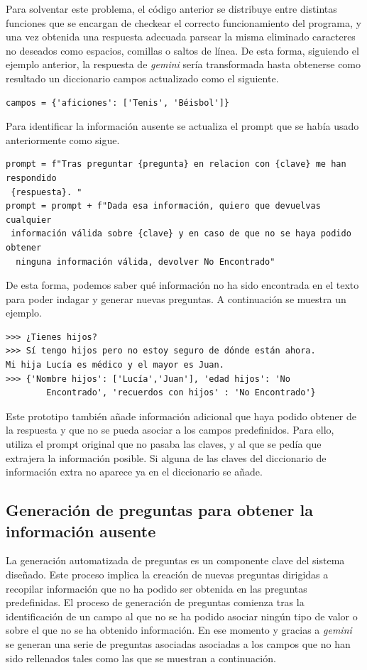 Para solventar este problema, el código anterior se distribuye entre distintas funciones que se encargan de checkear el correcto funcionamiento del programa, y una vez obtenida una respuesta adecuada parsear la misma eliminado caracteres no deseados como espacios, comillas o saltos de línea. De esta forma, siguiendo el ejemplo anterior, la respuesta de \textit{gemini} sería transformada hasta obtenerse como resultado un diccionario campos actualizado como el siguiente.  
\begin{verbatim}
campos = {'aficiones': ['Tenis', 'Béisbol']}
\end{verbatim}

Para identificar la información ausente se actualiza el prompt que se había usado anteriormente como sigue.  

\begin{verbatim}
prompt = f"Tras preguntar {pregunta} en relacion con {clave} me han respondido
 {respuesta}. "
prompt = prompt + f"Dada esa información, quiero que devuelvas cualquier
 información válida sobre {clave} y en caso de que no se haya podido obtener
  ninguna información válida, devolver No Encontrado"
\end{verbatim}
De esta forma, podemos saber qué información no ha sido encontrada en el texto para poder indagar y generar nuevas preguntas. A continuación se muestra un ejemplo.
\begin{verbatim}
>>>	¿Tienes hijos?
>>> Sí tengo hijos pero no estoy seguro de dónde están ahora.
Mi hija Lucía es médico y el mayor es Juan.
>>> {'Nombre hijos': ['Lucía','Juan'], 'edad hijos': 'No
		Encontrado', 'recuerdos con hijos' : 'No Encontrado'}
\end{verbatim}

Este prototipo también añade información adicional que haya podido obtener de la respuesta y que no se pueda asociar a los campos predefinidos. Para ello, utiliza el prompt original que no pasaba las claves, y al que se pedía que extrajera la información posible. Si alguna de las claves del diccionario de información extra no aparece ya en el diccionario se añade. 

\subsection{Generación de preguntas para obtener la información ausente}
\label{generacionpreguntas}
La generación automatizada de preguntas es un componente clave del sistema diseñado. Este proceso implica la creación de nuevas preguntas dirigidas a recopilar información que no ha podido ser obtenida en las preguntas predefinidas. El proceso de generación de preguntas comienza tras la identificación de un campo al que no se ha podido asociar ningún tipo de valor o sobre el que no se ha obtenido información. En ese momento y gracias a \textit{gemini} se generan una serie de preguntas asociadas asociadas a los campos que no han sido rellenados tales como las que se muestran a continuación.  

